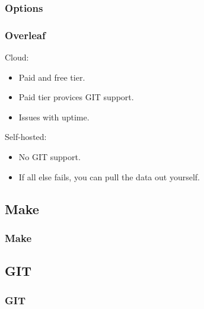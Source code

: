 {\subsubsection{Options}
\begin{frame}[fragile]
  \frametitle{Overleaf }
  \vspace{3mm}
  Cloud:
  \begin{itemize}
    \item Paid and free tier.
    \item Paid tier provices GIT support.
    \item Issues with uptime.
  \end{itemize}
  
  \vspace{5mm}
  Self-hosted:
  \begin{itemize}
    \item No GIT support.
    \item If all else fails, you can pull the data out yourself.
  \end{itemize}
\end{frame}

\subsection{Make}
\begin{frame}[fragile]
  \frametitle{Make}
  \vspace{3mm}
  
\end{frame}

\subsection{GIT}
\begin{frame}[fragile]
  \frametitle{GIT}
  \vspace{3mm}
  
\end{frame}

}


